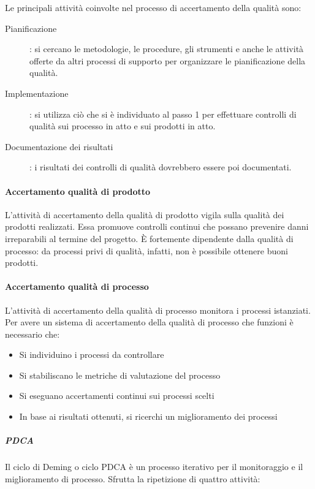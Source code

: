 \documentclass[../norme-di-progetto.tex]{subfiles}
\begin{document}
Le principali attività coinvolte nel processo di accertamento della qualità sono:

\begin{description}
  \item [Pianificazione]: si cercano le metodologie, le procedure, gli strumenti e anche le attività offerte da altri processi di supporto per organizzare le pianificazione della qualità.
  \item [Implementazione]: si utilizza ciò che si è individuato al passo 1 per effettuare controlli di qualità sui processo in atto e sui prodotti in atto.
  \item [Documentazione dei risultati]: i risultati dei controlli di qualità dovrebbero essere poi documentati.
\end{description}

\paragraph{Accertamento qualità di prodotto}%
\label{par:accertamento_qualita_di_prodotto}
L'attività di accertamento della qualità di prodotto vigila sulla qualità dei prodotti realizzati. Essa promuove controlli continui che possano prevenire danni irreparabili al termine del progetto. È fortemente dipendente dalla qualità di processo: da processi privi di qualità, infatti, non è possibile ottenere buoni prodotti.

\paragraph{Accertamento qualità di processo}%
\label{par:accertamento_qualita_di_processo}
L'attività di accertamento della qualità di processo monitora i processi istanziati. Per avere un sistema di accertamento della qualità di processo che funzioni è necessario che:

\begin{itemize}
  \item Si individuino i processi da controllare
  \item Si stabiliscano le metriche di valutazione del processo
  \item Si eseguano accertamenti continui sui processi scelti
  \item In base ai risultati ottenuti, si ricerchi un miglioramento dei processi
\end{itemize}

\subparagraph{PDCA}%
\label{subp:PDCA}
Il ciclo di Deming o ciclo PDCA è un processo iterativo per il monitoraggio e il miglioramento di processo. Sfrutta la ripetizione di quattro attività:
\end{document}
